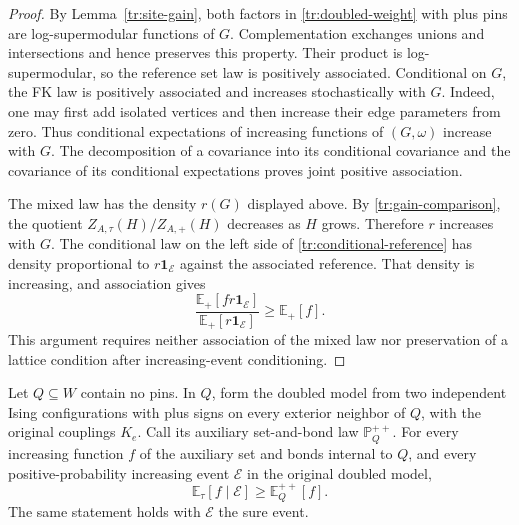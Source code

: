 \begin{proof}
By Lemma~\ref{tr:site-gain}, both factors in
\eqref{tr:doubled-weight} with plus pins are log-supermodular functions of
$G$. Complementation exchanges unions and intersections and hence
preserves this property. Their product is log-supermodular, so the
reference set law is positively associated. Conditional on $G$, the FK
law is positively associated and increases stochastically with $G$.
Indeed, one may first add isolated vertices and then increase their edge
parameters from zero. Thus conditional expectations of increasing
functions of $(G,\omega)$ increase with $G$. The decomposition of a
covariance into its conditional covariance and the covariance of its
conditional expectations proves joint positive association.

The mixed law has the density $r(G)$ displayed above.
By \eqref{tr:gain-comparison}, the quotient $Z_{A,\tau}(H)/Z_{A,+}(H)$
decreases as $H$ grows. Therefore $r$ increases with $G$. The conditional
law on the left side of \eqref{tr:conditional-reference} has density
proportional to $r\mathbf1_{\mathcal E}$ against the associated reference.
That density is increasing, and association gives
\[
 \frac{\mathbb E_+[f r\mathbf1_{\mathcal E}]}
 {\mathbb E_+[r\mathbf1_{\mathcal E}]}
 \geq\mathbb E_+[f].
\]
This argument requires neither association of the mixed law nor
preservation of a lattice condition after increasing-event conditioning.
\end{proof}

\begin{proposition}
\label{tr:local-domination}
Let $Q\subseteq W$ contain no pins. In $Q$, form the doubled model from two
independent Ising configurations with plus signs on every exterior
neighbor of $Q$, with the original couplings $K_e$. Call its auxiliary
set-and-bond law $\mathbb P_Q^{++}$. For every increasing function $f$ of
the auxiliary set and bonds internal to $Q$, and every positive-probability
increasing event $\mathcal E$ in the original doubled model,
\begin{equation}
\label{tr:local-domination-eq}
 \mathbb E_\tau[f\mid\mathcal E]\geq\mathbb E_Q^{++}[f].
\end{equation}
The same statement holds with $\mathcal E$ the sure event.
\end{proposition}

